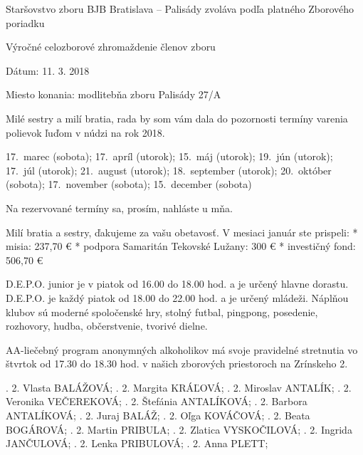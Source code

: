 

Staršovstvo zboru BJB Bratislava – Palisády zvoláva podľa platného Zborového poriadku

Výročné celozborové zhromaždenie členov zboru

Dátum: 11. 3. 2018

Miesto konania: modlitebňa zboru Palisády 27/A


Milé sestry a milí bratia, rada by som vám dala do pozornosti termíny varenia polievok ľuďom v núdzi na rok 2018.

17.~marec (sobota); 17.~apríl (utorok); 15.~máj (utorok); 19.~jún (utorok); 17.~júl (utorok); 21.~august (utorok); 18.~september (utorok); 20.~október (sobota); 17.~november (sobota); 15.~december (sobota)

Na rezervované termíny sa, prosím, nahláste u mňa.


Milí bratia a sestry, ďakujeme za vašu obetavosť. V mesiaci január ste prispeli:
\begitems
* misia: 237,70 €
* podpora Samaritán Tekovské Lužany: 300 €
* investičný fond: 506,70 €
\enditems

D.E.P.O. junior je v piatok od 16.00 do 18.00 hod. a je určený hlavne dorastu. D.E.P.O. je každý piatok od 18.00 do 22.00 hod. a je určený mládeži. Náplňou klubov sú moderné spoločenské hry, stolný futbal, pingpong, posedenie, rozhovory, hudba, občerstvenie, tvorivé dielne.

AA-liečebný program anonymných alkoholikov má svoje pravidelné stretnutia vo štvrtok od 17.30 do 18.30 hod. v našich zborových priestoroch na Zrínskeho 2.



.	2.	Vlasta	BALÁŽOVÁ;
.	2.	Margita 	KRÁĽOVÁ;
.	2.	Miroslav 	ANTALÍK;
.	2.	Veronika	VEČEREKOVÁ;
.	2.	Štefánia 	ANTALÍKOVÁ;
.	2.	Barbora 	ANTALÍKOVÁ;
.	2.	Juraj 	BALÁŽ;
.	2.	Oľga 	KOVÁČOVÁ;
.	2.	Beata 	BOGÁROVÁ;
. 2.	Martin	PRIBULA;
. 2.	Zlatica 	VYSKOČILOVÁ;
.	2.	Ingrida 	JANČULOVÁ;
. 2.	Lenka	PRIBULOVÁ;
.	2.	Anna	PLETT;
\narodeniny

